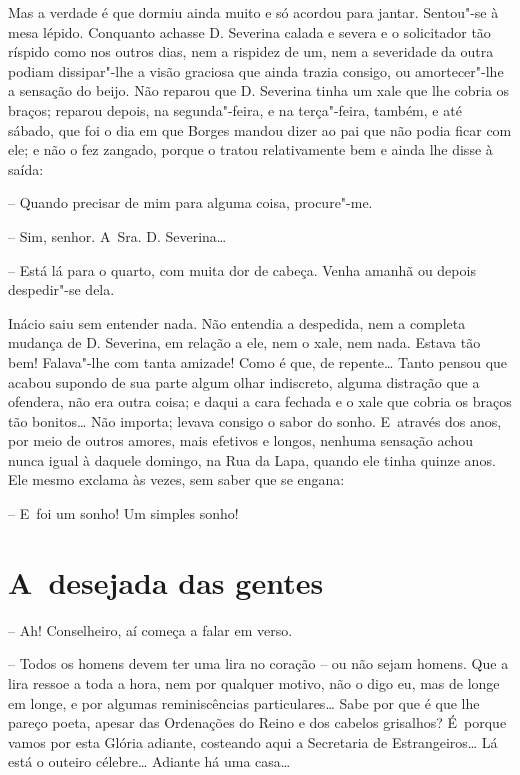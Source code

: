 Mas a verdade é que dormiu ainda muito e só acordou para jantar.
Sentou"-se à mesa lépido. Conquanto achasse D. Severina calada e severa e
o solicitador tão ríspido como nos outros dias, nem a rispidez de um,
nem a severidade da outra podiam dissipar"-lhe a visão graciosa que ainda
trazia consigo, ou amortecer"-lhe a sensação do beijo. Não reparou que D.
Severina tinha um xale que lhe cobria os braços; reparou depois, na
segunda"-feira, e na terça"-feira, também, e até sábado, que foi o dia em
que Borges mandou dizer ao pai que não podia ficar com ele; e não o fez
zangado, porque o tratou relativamente bem e ainda lhe disse à saída:

-- Quando precisar de mim para alguma coisa, procure"-me.

-- Sim, senhor. A~Sra. D. Severina\ldots{}

-- Está lá para o quarto, com muita dor de cabeça. Venha amanhã ou
depois despedir"-se dela.

Inácio saiu sem entender nada. Não entendia a despedida, nem a completa
mudança de D. Severina, em relação a ele, nem o xale, nem nada. Estava
tão bem! Falava"-lhe com tanta amizade! Como é que, de repente\ldots{} Tanto
pensou que acabou supondo de sua parte algum olhar indiscreto, alguma
distração que a ofendera, não era outra coisa; e daqui a cara fechada e
o xale que cobria os braços tão bonitos\ldots{} Não importa; levava consigo o
sabor do sonho. E~através dos anos, por meio de outros amores, mais
efetivos e longos, nenhuma sensação achou nunca igual à daquele domingo,
na Rua da Lapa, quando ele tinha quinze anos. Ele mesmo exclama às
vezes, sem saber que se engana:

-- E~foi um sonho! Um simples sonho!

\chapter{A~desejada das gentes}

-- Ah! Conselheiro, aí começa a falar em verso.

-- Todos os homens devem ter uma lira no coração -- ou não sejam homens.
Que a lira ressoe a toda a hora, nem por qualquer motivo, não o digo eu,
mas de longe em longe, e por algumas reminiscências particulares\ldots{} Sabe
por que é que lhe pareço poeta, apesar das Ordenações do Reino e dos
cabelos grisalhos? É~porque vamos por esta Glória adiante, costeando
aqui a Secretaria de Estrangeiros\ldots{} Lá está o outeiro célebre\ldots{}
Adiante há uma casa\ldots{}


